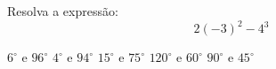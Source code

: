 Resolva a expressão:
\[2(-3)^2-4^3\]

$6^\circ$ e $96^\circ$
$4^\circ$ e $94^\circ$
$15^\circ$ e $75^\circ$
$120^\circ$ e $60^\circ$
$90^\circ$ e $45^\circ$




